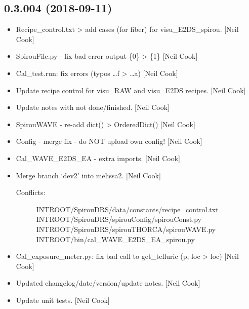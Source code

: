 \documentclass[a4paper,10pt,english]{report}
\begin{document}
\subsection{0.3.004 (2018-09-11)}
\label{\detokenize{misc/changelog:id329}}\begin{itemize}
\item {} 
Recipe\_control.txt \textendash{}\textgreater{} add cases (for fiber) for visu\_E2DS\_spirou.
{[}Neil Cook{]}

\item {} 
SpirouFile.py - fix bad error output \{0\} \textendash{}\textgreater{} \{1\} {[}Neil Cook{]}

\item {} 
Cal\_test.run: fix errors (typos …f \textendash{}\textgreater{} …a) {[}Neil Cook{]}

\item {} 
Update recipe control for visu\_RAW and visu\_E2DS recipes. {[}Neil Cook{]}

\item {} 
Update notes with not done/finished. {[}Neil Cook{]}

\item {} 
SpirouWAVE - re-add dict() \textendash{}\textgreater{} OrderedDict() {[}Neil Cook{]}

\item {} 
Config - merge fix - do NOT upload own config! {[}Neil Cook{]}

\item {} 
Cal\_WAVE\_E2DS\_EA - extra imports. {[}Neil Cook{]}

\item {} 
Merge branch ‘dev2’ into melissa2. {[}Neil Cook{]}
\begin{description}
\item[{Conflicts:}] \leavevmode
INTROOT/SpirouDRS/data/constants/recipe\_control.txt
INTROOT/SpirouDRS/spirouConfig/spirouConst.py
INTROOT/SpirouDRS/spirouTHORCA/spirouWAVE.py
INTROOT/bin/cal\_WAVE\_E2DS\_EA\_spirou.py

\end{description}

\item {} 
Cal\_exposure\_meter.py: fix bad call to get\_telluric (p, loc \textendash{}\textgreater{} loc)
{[}Neil Cook{]}

\item {} 
Updated changelog/date/version/update notes. {[}Neil Cook{]}

\item {} 
Update unit tests. {[}Neil Cook{]}


\end{itemize}
\end{document}
